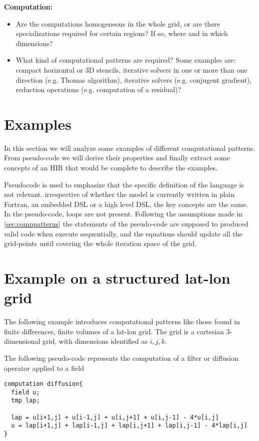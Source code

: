 \documentclass[a4paper,10pt]{scrartcl}
\begin{document}
\textbf{Computation:}\newline
\begin{itemize}
  \item Are the computations homogeneous in the whole grid, or are there specializations required for certain regions? If so, where and in which dimensions?
  \item What kind of computational patterns are required? Some examples are: compact horizontal or 3D stencils, iterative solvers in one or more than one direction (e.g. Thomas algorithm), iterative solvers (e.g. conjugent gradient), reduction operations (e.g. computation of a residual)?
\end{itemize}


\section{Examples}
In this section we will analyze some examples of different computational patterns. From pseudo-code we will derive their properties and finally extract some concepts of an HIR that would be complete to describe the examples.
 
Pseudocode is used to emphasize that the specific definition of the language is not relevant.
irrespective of whether the model is currently written in plain Fortran, an embedded DSL or a high level DSL, the key concepts are the same.
In the pseudo-code, loops are not present. Following the assumptions made in \cref{sec:comppatterns} the statements of the pseudo-code are supposed to produced valid code when execute sequentially, and the equations should update all the grid-points until covering the whole iteration space of the grid. 

\section{Example on a structured lat-lon grid}
The following example introduces computational patterns like those found in finite differences, finite volumes of a lat-lon grid. The grid is a cartesian 3-dimensional grid, with dimensions identified as $i,j,k$.

The following pseudo-code represents the computation of a filter or diffusion operator applied to a field

\begin{lstlisting}
computation diffusion{
  field u; 
  tmp lap;

  lap = u[i+1,j] + u[i-1,j] + u[i,j+1] + u[i,j-1] - 4*u[i,j]
  u = lap[i+1,j] + lap[i-1,j] + lap[i,j+1] + lap[i,j-1] - 4*lap[i,j]
}
\end{lstlisting}
\end{document}
